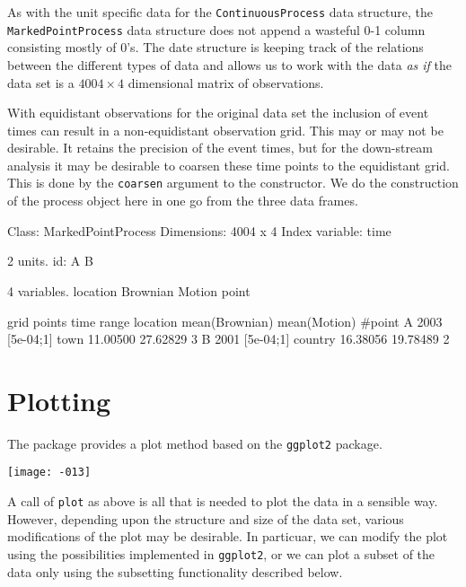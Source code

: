 \documentclass[11pt,a4paper,twoside]{article}
\begin{document}
As with the unit specific data for the \verb+ContinuousProcess+ data
structure, the \verb+MarkedPointProcess+ data 
structure does not append a wasteful 0-1 column consisting mostly of 0's.
The date structure is keeping track of the relations
between the different types of data and allows us to work with the data
\emph{as if} the data set is a $4004 \times 4$ dimensional matrix of
observations. 

With equidistant observations for the original data set the inclusion
of event times can result in a non-equidistant observation
grid. This may or may not be desirable. It retains the precision of
the event times, but for the down-stream analysis it may be
desirable to coarsen these time points to the equidistant grid. This is
done by the \verb+coarsen+ argument to the constructor. We do the
construction of the process object here in one go from the three data
frames. 

\begin{Schunk}
\begin{Soutput}
Class: MarkedPointProcess 
Dimensions: 4004 x 4 
Index variable: time 

2 units.
   id: A B

4 variables.
   location Brownian Motion point

  grid points time range location mean(Brownian) mean(Motion) #point
A        2003  [5e-04;1]     town       11.00500     27.62829      3
B        2001  [5e-04;1]  country       16.38056     19.78489      2
\end{Soutput}
\end{Schunk}


\section{Plotting}

The package provides a plot method based on the \verb+ggplot2+
package. 

\texttt{[image: -013]}

A call of \verb+plot+  as above is all that is
needed to plot the data in a sensible way. However, depending upon the
structure and size of the data set, various
modifications of the plot may be desirable. In particuar,
we can modify the plot using the
possibilities implemented in \verb+ggplot2+, or we can plot a subset
of the data only using the subsetting functionality described below. 
\end{document}
